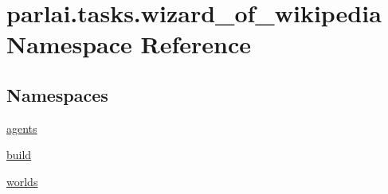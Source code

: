 \hypertarget{namespaceparlai_1_1tasks_1_1wizard__of__wikipedia}{}\section{parlai.\+tasks.\+wizard\+\_\+of\+\_\+wikipedia Namespace Reference}
\label{namespaceparlai_1_1tasks_1_1wizard__of__wikipedia}
\subsection*{Namespaces}
\begin{DoxyCompactItemize}
\item 
 \hyperlink{namespaceparlai_1_1tasks_1_1wizard__of__wikipedia_1_1agents}{agents}
\item 
 \hyperlink{namespaceparlai_1_1tasks_1_1wizard__of__wikipedia_1_1build}{build}
\item 
 \hyperlink{namespaceparlai_1_1tasks_1_1wizard__of__wikipedia_1_1worlds}{worlds}
\end{DoxyCompactItemize}
